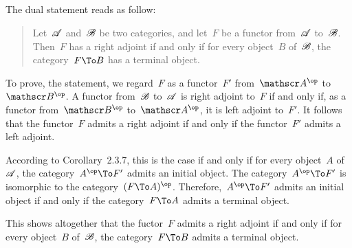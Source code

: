\subsection{}

The dual statement reads as follow:
\begin{quote}
	Let~$\mathscr{A}$ and~$\mathscr{B}$ be two categories, and let~$F$ be a functor from~$\mathscr{A}$ to~$\mathscr{B}$.
	Then~$F$ has a right adjoint if and only if for every object~$B$ of~$\mathscr{B}$, the category~$F \To B$ has a terminal object.
\end{quote}

To prove, the statement, we regard~$F$ as a functor~$F'$ from~$\Acat^{\op}$ to~$\Bcat^{\op}$.
A functor from~$\mathscr{B}$ to~$\mathscr{A}$ is right adjoint to~$F$ if and only if, as a functor from~$\Bcat^{\op}$ to~$\Acat^{\op}$, it is left adjoint to~$F'$.
It follows that the functor~$F$ admits a right adjoint if and only if the functor~$F'$ admits a left adjoint.

According to Corollary~2.3.7, this is the case if and only if for every object~$A$ of~$\mathscr{A}$, the category~$A^{\op} \To F'$ admits an initial object.
The category~$A^{\op} \To F'$ is isomorphic to the category~$(F \To A)^{\op}$.
Therefore,~$A^{\op} \To F'$ admits an initial object if and only if the category~$F \To A$ admits a terminal object.

This shows altogether that the fuctor~$F$ admits a right adjoint if and only if for every object~$B$ of~$\mathscr{B}$, the category~$F \To B$ admits a terminal object.
